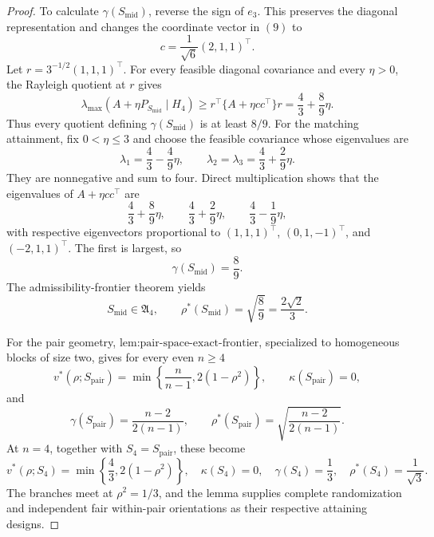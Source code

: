 \documentclass{article}
\begin{document}
\begin{proof}
To calculate \(\gamma(S_{\mathrm{mid}})\), reverse the sign of \(e_3\).  This preserves the diagonal representation and changes the coordinate vector in \((9)\) to
\[
c=\frac1{\sqrt6}(2,1,1)^\top.
\tag{11}
\]
Let \(r=3^{-1/2}(1,1,1)^\top\).  For every feasible diagonal covariance and every \(\eta>0\), the Rayleigh quotient at \(r\) gives
\[
\lambda_{\max}(A+\eta P_{S_{\mathrm{mid}}}\mid H_4)
\geq r^\top\{A+\eta cc^\top\}r
=\frac43+\frac89\eta.
\tag{12}
\]
Thus every quotient defining \(\gamma(S_{\mathrm{mid}})\) is at least \(8/9\).  For the matching attainment, fix \(0<\eta\leq3\) and choose the feasible covariance whose eigenvalues are
\[
\lambda_1=\frac43-\frac49\eta,
\qquad
\lambda_2=\lambda_3=\frac43+\frac29\eta.
\tag{13}
\]
They are nonnegative and sum to four.  Direct multiplication shows that the eigenvalues of \(A+\eta cc^\top\) are
\[
\frac43+\frac89\eta,
\qquad
\frac43+\frac29\eta,
\qquad
\frac43-\frac19\eta,
\tag{14}
\]
with respective eigenvectors proportional to \((1,1,1)^\top\), \((0,1,-1)^\top\), and \((-2,1,1)^\top\).  The first is largest, so
\[
\gamma(S_{\mathrm{mid}})=\frac89.
\tag{15}
\]
The admissibility-frontier theorem yields
\[
S_{\mathrm{mid}}\in\mathfrak A_4,
\qquad
\rho^*(S_{\mathrm{mid}})=\sqrt{\frac89}=\frac{2\sqrt2}{3}.
\tag{16}
\]

For the pair geometry, \(\text{lem:pair-space-exact-frontier}\), specialized to homogeneous blocks of size two, gives for every even \(n\geq4\)
\[
v^*(\rho;S_{\mathrm{pair}})
=\min\left\{\frac{n}{n-1},2(1-\rho^2)\right\},
\qquad
\kappa(S_{\mathrm{pair}})=0,
\tag{17}
\]
and
\[
\gamma(S_{\mathrm{pair}})=\frac{n-2}{2(n-1)},
\qquad
\rho^*(S_{\mathrm{pair}})=\sqrt{\frac{n-2}{2(n-1)}}.
\tag{18}
\]
At \(n=4\), together with \(S_4=S_{\mathrm{pair}}\), these become
\[
v^*(\rho;S_4)=\min\left\{\frac43,2(1-\rho^2)\right\},
\quad
\kappa(S_4)=0,
\quad
\gamma(S_4)=\frac13,
\quad
\rho^*(S_4)=\frac1{\sqrt3}.
\tag{19}
\]
The branches meet at \(\rho^2=1/3\), and the lemma supplies complete randomization and independent fair within-pair orientations as their respective attaining designs.


\end{proof}
\end{document}

